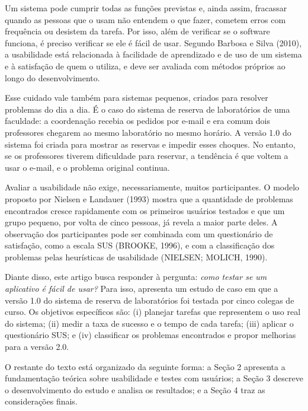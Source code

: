 \documentclass[a4paper,12pt]{article}
\begin{document}
Um sistema pode cumprir todas as funções previstas e, ainda assim,
fracassar quando as pessoas que o usam não entendem o que fazer,
cometem erros com frequência ou desistem da tarefa. Por isso, além de
verificar se o software funciona, é preciso verificar se ele é fácil
de usar. Segundo Barbosa e Silva (2010), a usabilidade está relacionada
à facilidade de aprendizado e de uso de um sistema e à satisfação de
quem o utiliza, e deve ser avaliada com métodos próprios ao longo do
desenvolvimento.

Esse cuidado vale também para sistemas pequenos, criados para resolver
problemas do dia a dia. É o caso do sistema de reserva de laboratórios
de uma faculdade: a coordenação recebia os pedidos por e-mail e era
comum dois professores chegarem ao mesmo laboratório no mesmo horário.
A versão 1.0 do sistema foi criada para mostrar as reservas e impedir
esses choques. No entanto, se os professores tiverem dificuldade para
reservar, a tendência é que voltem a usar o e-mail, e o problema
original continua.

Avaliar a usabilidade não exige, necessariamente, muitos participantes.
O modelo proposto por Nielsen e Landauer (1993) mostra que a quantidade
de problemas encontrados cresce rapidamente com os primeiros usuários
testados e que um grupo pequeno, por volta de cinco pessoas, já revela
a maior parte deles. A observação dos participantes pode ser combinada
com um questionário de satisfação, como a escala SUS (BROOKE, 1996), e
com a classificação dos problemas pelas heurísticas de usabilidade
(NIELSEN; MOLICH, 1990).

Diante disso, este artigo busca responder à pergunta: \emph{como testar
se um aplicativo é fácil de usar?} Para isso, apresenta um estudo de
caso em que a versão 1.0 do sistema de reserva de laboratórios foi
testada por cinco colegas de curso. Os objetivos específicos são:
(i) planejar tarefas que representem o uso real do sistema;
(ii) medir a taxa de sucesso e o tempo de cada tarefa;
(iii) aplicar o questionário SUS; e
(iv) classificar os problemas encontrados e propor melhorias para a
versão 2.0.

O restante do texto está organizado da seguinte forma: a Seção 2
apresenta a fundamentação teórica sobre usabilidade e testes com
usuários; a Seção 3 descreve o desenvolvimento do estudo e analisa os
resultados; e a Seção 4 traz as considerações finais.

\end{document}
